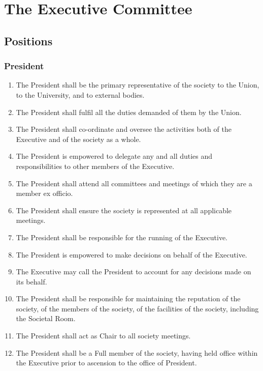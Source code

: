 \documentclass{scrartcl}
\begin{document}
    \clearpage
    \section{The Executive Committee}
        \label{executive}
        \subsection{Positions}
            \label{executive--positions}
            \subsubsection{President}
                \label{executive--positions--president}
                \begin{enumerate}
                    \item The President shall be the primary representative of the society to the Union, to the University, and to external bodies.
                    \item The President shall fulfil all the duties demanded of them by the Union.
                    \item The President shall co-ordinate and oversee the activities both of the Executive and of the society as a whole.
                    \item The President is empowered to delegate any and all duties and responsibilities to other members of the Executive.
                    \item The President shall attend all committees and meetings of which they are a member ex officio.
                    \item The President shall ensure the society is represented at all applicable meetings.
                    \item The President shall be responsible for the running of the Executive.
                    \item The President is empowered to make decisions on behalf of the Executive.
                    \item The Executive may call the President to account for any decisions made on its behalf.
                    \item The President shall be responsible for maintaining the reputation of the society, of the members of the society, of the facilities of the society, including the Societal Room.
                    \item The President shall act as Chair to all society meetings.
                    \item The President shall be a Full member of the society, having held office within the Executive prior to ascension to the office of President.
                \end{enumerate}
\end{document}
